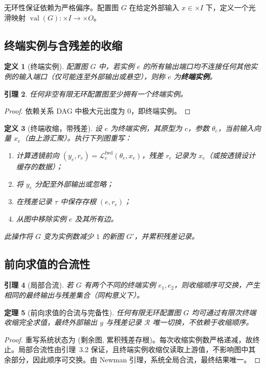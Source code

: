 \documentclass{ctexart}
\newcommand{\bigtimes}{\times}
\newtheorem{theorem}{定理}[section]
\newtheorem{lemma}[theorem]{引理}
\newtheorem{definition}[theorem]{定义}
\DeclareMathOperator{\val}{val}
\begin{document}
无环性保证依赖为严格偏序。配置图 $G$ 在给定外部输入 $x\in \bigtimes I$ 下，定义一个光滑映射 $\val(G) : \bigtimes I \to \bigtimes O$。

\subsection{终端实例与含残差的收缩}

\begin{definition}[终端实例]
配置图 $G$ 中，若实例 $e$ 的所有输出端口均不连接任何其他实例的输入端口（仅可能连至外部输出或悬空），则称 $e$ 为\textbf{终端实例}。
\end{definition}

\begin{lemma}
任何非空有限无环配置图至少拥有一个终端实例。
\end{lemma}
\begin{proof}
依赖关系 DAG 中极大元出度为 0，即终端实例。
\end{proof}

\begin{definition}[终端收缩，带残差]
设 $e$ 为终端实例，其原型为 $c$，参数 $\theta_e$，当前输入向量 $x_e$（由上游汇聚）。执行下列图重写：
\begin{enumerate}
    \item 计算透镜前向 $(y_e, r_e) = \mathcal{L}_c^{\mathrm{fwd}}(\theta_e, x_e)$，残差 $r_e$ 记录为 $x_e$（或按透镜设计缓存的数据）；
    \item 将 $y_e$ 分配至外部输出或忽略；
    \item 在残差记录 $\tau$ 中保存存根 $(e, r_e)$；
    \item 从图中移除实例 $e$ 及其所有边。
\end{enumerate}
此操作将 $G$ 变为实例数减少 $1$ 的新图 $G'$，并累积残差记录。
\end{definition}

\subsection{前向求值的合流性}

\begin{lemma}[局部合流]
若 $G$ 有两个不同的终端实例 $e_1, e_2$，则收缩顺序可交换，产生相同的最终输出与残差集合（同构意义下）。
\end{lemma}

\begin{theorem}[前向求值的合流与完备性]
任何有限无环配置图 $G$ 均可通过有限次终端收缩完全求值，最终外部输出 $y$ 与残差记录 $\mathcal{R}$ 唯一切换，不依赖于收缩顺序。
\end{theorem}
\begin{proof}
重写系统状态为 (剩余图, 累积残差存根)。每次收缩实例数严格递减，故终止。局部合流性由引理~3.2 保证，且终端实例收缩仅读取上游值，不影响图中其余部分，因此顺序可交换。由 Newman 引理，系统全局合流，最终结果唯一。
\end{proof}
\end{document}
